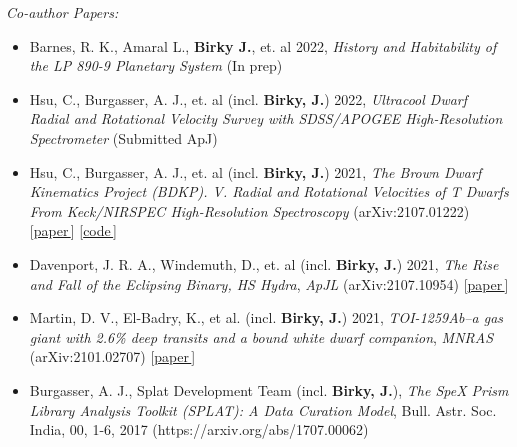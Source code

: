 \documentclass[a4,10.5pt]{article}
\let\orighref\href
\renewcommand{\href}[2]{\orighref{#1}{#2\,\scriptsize\faExternalLink}}
\begin{document}
\textsl{Co-author Papers:} 
\begin{itemize}[itemsep=0pt]
    \item Barnes, R. K., Amaral L., \textbf{Birky J.}, et. al 2022, \textsl{History and Habitability of the LP 890-9 Planetary System} (In prep) 
    \item Hsu, C., Burgasser, A. J., et. al (incl. \textbf{Birky, J.}) 2022, \textsl{Ultracool Dwarf Radial and Rotational Velocity Survey with SDSS/APOGEE High-Resolution Spectrometer} (Submitted ApJ) 
    \item Hsu, C., Burgasser, A. J., et. al (incl. \textbf{Birky, J.}) 2021, \textsl{The Brown Dwarf Kinematics Project (BDKP). V. Radial and Rotational Velocities of T Dwarfs From Keck/NIRSPEC High-Resolution Spectroscopy} (arXiv:2107.01222)  [\href{https://arxiv.org/abs/2107.01222}{paper}] [\href{https://github.com/chihchunhsu/smart}{code}] 
    \item Davenport, J. R. A., Windemuth, D., et. al (incl. \textbf{Birky, J.}) 2021, \textsl{The Rise and Fall of the Eclipsing Binary, HS Hydra}, \textit{ApJL} (arXiv:2107.10954) [\href{https://arxiv.org/abs/2107.10954}{paper}] 
    \item Martin, D. V., El-Badry, K., et al. (incl. \textbf{Birky, J.}) 2021, \textsl{TOI-1259Ab--a gas giant with 2.6\% deep transits and a bound white dwarf companion}, \textit{MNRAS} (arXiv:2101.02707) [\href{https://arxiv.org/abs/2101.02707}{paper}]
    \item Burgasser, A. J., Splat Development Team (incl. \textbf{Birky, J.}), \textsl{The SpeX Prism Library Analysis Toolkit (SPLAT): A Data Curation Model}, Bull. Astr. Soc. India, 00, 1-6, 2017 (https://arxiv.org/abs/1707.00062)
\end{itemize}

\newpage
\end{document}
